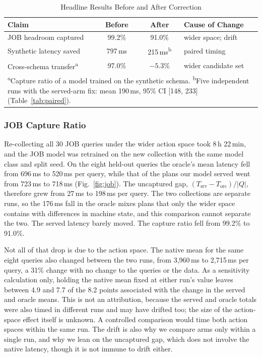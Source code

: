 \documentclass[conference]{IEEEtran}
\begin{document}
\begin{table}[t]
\caption{Headline Results Before and After Correction}
\label{tab:corrections}
\centering
\footnotesize
\setlength{\tabcolsep}{3pt}
\begin{tabular}{|l|c|c|l|}
\hline
\textbf{Claim} & \textbf{Before} & \textbf{After} & \textbf{Cause of Change} \\
\hline
JOB headroom captured & 99.2\% & 91.0\% & wider space; drift \\
\hline
Synthetic latency saved & 797\,ms & 215\,ms\textsuperscript{b} & paired timing \\
\hline
Cross-schema transfer\textsuperscript{a} & 97.0\% & $-5.3$\% &
  wider candidate set \\
\hline
\multicolumn{4}{p{0.94\columnwidth}}{\scriptsize \textsuperscript{a}Capture
ratio of a model trained on the synthetic schema. \textsuperscript{b}Five
independent runs with the served-arm fix: mean 190\,ms, 95\% CI [148, 233]
(Table~\ref{tab:paired}).}
\end{tabular}
\end{table}

\subsubsection{JOB Capture Ratio}
Re-collecting all 30 JOB queries under the wider action space
took 8\,h 22\,min, and the JOB model was retrained on the new collection with
the same model class and split seed. On the eight held-out queries the
oracle's mean latency fell from 696\,ms to 520\,ms per query, while that of the
plans our model served went from 723\,ms to 718\,ms (Fig.~\ref{fig:job}). The
uncaptured gap, $(T_{\mathrm{srv}} - T_{\mathrm{orc}})/|Q|$, therefore grew
from 27\,ms to 198\,ms per query. The two collections are separate runs, so
the 176\,ms fall in the oracle mixes plans that only the wider space contains
with differences in machine state, and this comparison cannot separate the
two. The served latency barely moved. The capture ratio fell from 99.2\% to
91.0\%.

Not all of that drop is due to the action space. The native mean for the same
eight queries also changed between the two runs, from 3,960\,ms to 2,715\,ms per
query, a 31\% change with no change to the queries or the data. As a
sensitivity calculation only, holding the native mean fixed at either run's
value leaves between 4.9 and 7.7 of the 8.2 points associated with the change
in the served and oracle means. This is
not an attribution, because the served and oracle totals were also timed in
different runs and may have drifted too; the size of the action-space effect
itself is unknown. A controlled comparison would time
both action spaces within the same run. The drift is also why we compare arms
only within a single run, and why we lean on the uncaptured gap, which does not
involve the native latency, though it is not immune to drift either.
\end{document}
